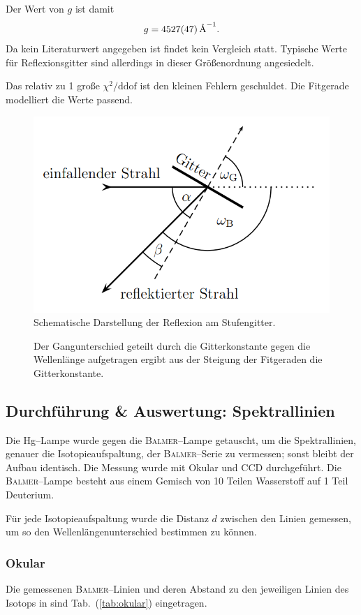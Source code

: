 \documentclass[sn-mathphys-num,iicol]{sn-jnl}
\theoremstyle{thmstyleone}
\theoremstyle{thmstyletwo}
\theoremstyle{thmstylethree}
\begin{document}
Der Wert von $g$ ist damit
\begin{align} 
        g=\SI{4527+-47}{\text{\r{A}}^{-1}}
.\end{align} 
Da kein Literaturwert angegeben ist findet kein Vergleich statt.
Typische Werte für Reflexionsgitter sind allerdings in dieser Größenordnung angesiedelt.

Das relativ zu 1 große $\chi ^2/\text{ddof}$ ist den kleinen Fehlern geschuldet.
Die Fitgerade modelliert die Werte passend.

\begin{figure}[t]
        \centering
        \includegraphics[width=.5\textwidth]{402_reflexion.png}
        \caption{Schematische Darstellung der Reflexion am Stufengitter.\cite{Anleitung402}} \label{fig:strahlengang}
\end{figure}
\begin{figure}[t] 
        \centering
        \resizebox{.5\textwidth}{!}{}
        \caption{Der Gangunterschied geteilt durch die Gitterkonstante gegen die Wellenlänge aufgetragen ergibt aus der Steigung der Fitgeraden die Gitterkonstante.} \label{fig:gitterkonstante}
\end{figure}

\subsection{Durchführung \& Auswertung: Spektrallinien}
Die Hg--Lampe wurde gegen die \textsc{Balmer}--Lampe getauscht, um die Spektrallinien, genauer die Isotopieaufspaltung, der \textsc{Balmer}--Serie zu vermessen; sonst bleibt der Aufbau identisch.
Die Messung wurde mit Okular und CCD durchgeführt.
Die \textsc{Balmer}--Lampe besteht aus einem Gemisch von 10 Teilen Wasserstoff auf 1 Teil Deuterium.

Für jede Isotopieaufspaltung wurde die Distanz $d$ zwischen den Linien gemessen, um so den Wellenlängenunterschied bestimmen zu können.

\subsubsection{Okular}
Die gemessenen \textsc{Balmer}--Linien und deren Abstand zu den jeweiligen Linien des Isotops in sind Tab.\ (\ref{tab:okular}) eingetragen.
\end{document}
